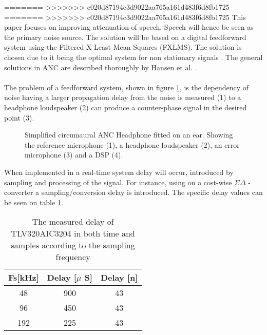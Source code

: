 =======
>>>>>>> c020d87194c3d9022aa765a161d483f6d8fb1725
=======
>>>>>>> c020d87194c3d9022aa765a161d483f6d8fb1725
This paper focuses on improving attenuation of speech. Speech will hence be seen as the primary noise source. The solution will be based on a digital feedforward system using the Filtered-X Least Mean Squares (FXLMS). The solution is chosen due to it being the optimal system for non stationary signals \cite{Hansen2}. The general solutions in ANC are described thoroughly by Hansen et al. \cite{Hansen}.
\\\\
The problem of a feedforward system, shown in figure \ref{fig:SystemOverview}, is the dependency of noise having a larger propagation delay from the noise is measured (1) to a headphone loudspeaker (2) can produce a counter-phase signal in the desired point (3). 
\begin{figure}[H]
	\centering
	
	\caption{Simplified circumaural ANC Headphone fitted on an ear. Showing the reference microphone (1), a headphone loudspeaker (2), an error microphone (3) and a DSP (4).}
	\label{fig:SystemOverview}
\end{figure}
When implemented in a real-time system delay will occur, introduced by sampling and processing of the signal. For instance, using on a cost-wise $\Sigma\Delta$ - converter a sampling/conversion delay is introduced. The specific delay values can be seen on table \ref{tab:DelayResults}.


\begin{table}[H]
	\centering
	\begin{tabular}{ccc}
		Fs[kHz] & Delay [$\mu$ S] & Delay [n] \\ \hline \hline
		48 & 900 & 43 \\ 
		96 & 450 & 43 \\
		192 & 225 & 43 
	\end{tabular} 
	\caption{The measured delay of TLV320AIC3204 in both time and samples according to the sampling frequency}
	\label{tab:DelayResults}
\end{table}

